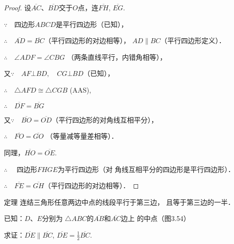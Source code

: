 \begin{proof}
    设$\overline{AC}$、$\overline{BD}$交于$O$点，连$\overline{FH}$, $\overline{EG}$.

$\because\quad $四边形$ABCD$是平行四边形（已知），

$\therefore\quad \overline{AD}=\overline{BC}$（平行四边形的对边相等），
$AD\parallel BC$（平行四边形定义）．

$\therefore\quad \angle ADF=\angle CBG$ （两条直线平行，内错角相等），

又$\because\quad AF\bot BD,\quad CG\bot BD$（已知），

$\therefore\quad \triangle AFD\cong \triangle CGB$ (AAS),

$\therefore\quad \overline{DF}=\overline{BG}$

又$\because\quad \overline{BO}=\overline{OD}$（平行四边形的对角线互相平分），

$\therefore\quad \overline{FO}=\overline{GO}$ （等量减等量差相等）．

同理，$\overline{HO}=\overline{OE}$.

$\therefore\quad$ 四边形$FHGE$为平行四边形（对
角线互相平分的四边形是平行四边形）．

$\therefore\quad \overline{FE}=\overline{GH}$（平行四边形的对边相等）．
\end{proof}

\begin{blk}
{定理} 连结三角形任意两边中点的线段平行于第三边，
且等于第三边的一半．    
\end{blk}

已知：$D$、$E$分别为
$\triangle ABC$的$\overline{AB}$和$\overline{AC}$边上
的中点（图3.54）

求证：$\overline{DE}\parallel \overline{BC}$, $\overline{DE}=\frac{1}{2}\overline{BC}$.

\begin{figure}[htp]
    \centering
{}
    \caption{}
\end{figure}

